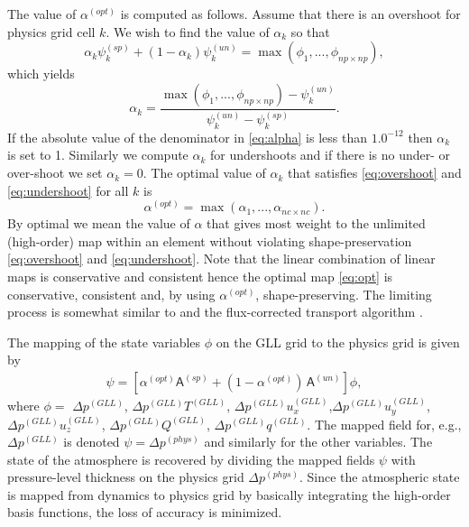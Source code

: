 The value of $\alpha^{(opt)}$ is computed as follows. Assume that there is an overshoot for physics grid cell $k$. We wish to find the value of $\alpha_k$ so that
\begin{equation}
\alpha_k \psi_k^{(sp)}+(1-\alpha_k) \psi_k^{(un)}=\max(\phi_1,...,\phi_{np\times np}),
\end{equation}
which yields
\begin{equation}
\alpha_k = \frac{\max(\phi_1,...,\phi_{np\times np})-\psi_k^{(un)}}{\psi_k^{(un)}-\psi_k^{(sp)}}.
\label{eq:alpha}
\end{equation}
If the absolute value of the denominator in \eqref{eq:alpha} is less than $1.0^{-12}$ then $\alpha_k$ is set to 1. Similarly we compute $\alpha_k$ for undershoots and if there is no under- or over-shoot we set $\alpha_k=0$. The optimal value of $\alpha_k$ that satisfies \eqref{eq:overshoot} and \eqref{eq:undershoot} for all $k$ is
\begin{equation}
\alpha^{(opt)}=\max(\alpha_1, ...,\alpha_{nc\times nc}).
\end{equation}
By optimal we mean the value of $\alpha$ that gives most weight to the unlimited (high-order) map within an element without violating shape-preservation \eqref{eq:overshoot} and \eqref{eq:undershoot}. Note that the linear combination of linear maps is conservative and consistent hence the optimal map \eqref{eq:opt} is conservative, consistent and, by using $\alpha^{(opt)}$, shape-preserving. The limiting process is somewhat similar to \citet{BJ1989} and the flux-corrected transport algorithm \citep{Z1979JCP}.

The mapping of the state variables $\phi$ on the GLL grid to the physics grid is given by
\begin{multline}
\bm{\mathsf{\psi}}=\left[ \alpha^{(opt)} \bm{\mathsf{A}}^{(sp)}+(1-\alpha^{(opt)})\, \bm{\mathsf{A}}^{(un)}\right] \bm{\mathsf{\phi}},
\end{multline}
where $\phi=$ $\Delta p^{(GLL)}$, $\Delta p^{(GLL)}T^{(GLL)}$, $\Delta p^{(GLL)}u_x^{(GLL)}$,$\Delta p^{(GLL)}u_y^{(GLL)}$,$\Delta p^{(GLL)}u_z^{(GLL)}$, $\Delta p^{(GLL)}Q^{(GLL)}$, $\Delta p^{(GLL)}q^{(GLL)}$. The mapped field for, e.g., $\Delta p^{(GLL)}$ is denoted $\psi=\Delta p^{(phys)}$ and similarly for the other variables. The state of the atmosphere is recovered by dividing the mapped fields $\psi$ with pressure-level thickness on the physics grid $\Delta p^{(phys)}$. Since the atmospheric state is mapped from dynamics to physics grid by basically integrating the high-order basis functions, the loss of accuracy is minimized.
%
%
